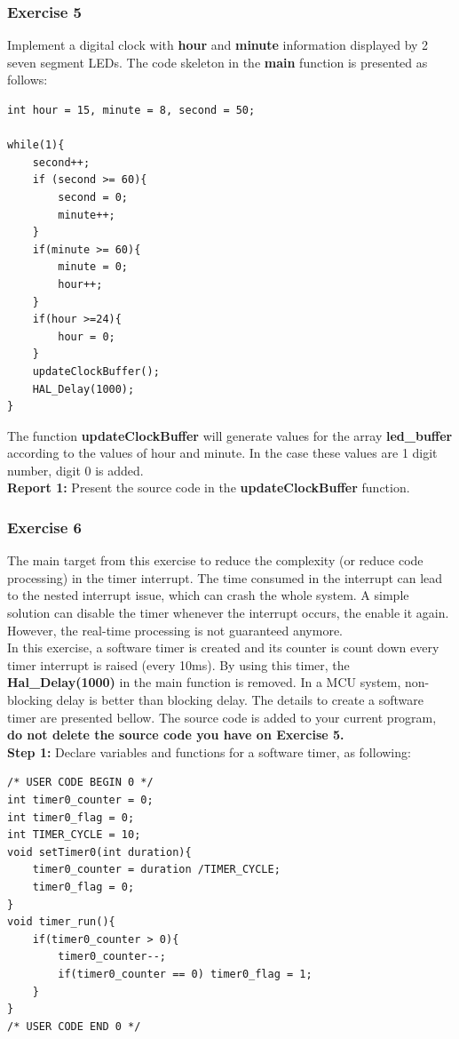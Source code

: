\subsubsection{Exercise 5}
Implement a digital clock with \textbf{hour} and \textbf {minute} information displayed by 2 seven segment LEDs. The code skeleton in the \textbf{main} function is presented as follows:
\begin{lstlisting}[caption=An example for your source code]
int hour = 15, minute = 8, second = 50;

while(1){
    second++;
    if (second >= 60){
        second = 0;
        minute++;
    }
    if(minute >= 60){
        minute = 0;
        hour++;
    }
    if(hour >=24){
        hour = 0;
    }
    updateClockBuffer();
    HAL_Delay(1000);
}
\end{lstlisting}

The function \textbf{updateClockBuffer} will generate values for the array \textbf{led\_buffer} according to the values of hour and minute. In the case these values are 1 digit number, digit 0 is added. \\

\textbf{Report 1: } Present the source code in the \textbf{updateClockBuffer} function.

\subsubsection{Exercise 6}
The main target from this exercise to reduce the complexity (or reduce code processing) in the timer interrupt. The time consumed in the interrupt can lead to the nested interrupt issue, which can crash the whole system. A simple solution can disable the timer whenever the interrupt occurs, the enable it again. However, the real-time processing is not guaranteed anymore.\\

In this exercise, a software timer is created and its counter is count down every timer interrupt is raised (every 10ms). By using this timer, the \textbf{Hal\_Delay(1000)} in the main function is removed. In a MCU system, non-blocking delay is better than blocking delay. The details to create a software timer are presented bellow. The source code is added to your current program, \textbf{do not delete the source code you have on Exercise 5.}\\

\textbf{Step 1: } Declare variables and functions for a software timer, as following:
\begin{lstlisting}[caption=Software timer based timer interrupt]
/* USER CODE BEGIN 0 */
int timer0_counter = 0;
int timer0_flag = 0;
int TIMER_CYCLE = 10;
void setTimer0(int duration){
	timer0_counter = duration /TIMER_CYCLE;
	timer0_flag = 0;
}
void timer_run(){
	if(timer0_counter > 0){
		timer0_counter--;
		if(timer0_counter == 0) timer0_flag = 1;
	}
}
/* USER CODE END 0 */
\end{lstlisting}

